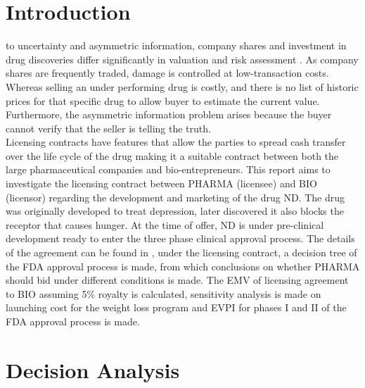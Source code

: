 \documentclass[journal]{IEEEtran}
\begin{document}
\section{Introduction}
 to uncertainty and asymmetric information, company shares and investment in drug discoveries differ significantly in valuation and risk assessment \cite{bioe}. As company shares are frequently traded, damage is controlled at low-transaction costs. Whereas selling an under performing drug is costly, and there is no list of historic prices for that specific drug to allow buyer to estimate the current value. Furthermore, the asymmetric information problem arises because the buyer cannot verify that the seller is telling the truth.\\
Licensing contracts have features that allow the parties to spread cash transfer over the life cycle of the drug making it a suitable contract between both the large pharmaceutical companies and bio-entrepreneurs. This report aims to investigate the licensing contract between PHARMA (licensee) and BIO (licensor) regarding the development and marketing of the drug ND. The drug was originally developed to treat depression, later discovered it also blocks the receptor that causes hunger. At the time of offer, ND is under pre-clinical development ready to enter the three phase clinical approval process. The details of the agreement can be found in \cite{coursework}, under the licensing contract, a decision tree of the FDA approval process is made, from which conclusions on whether PHARMA should bid under different conditions is made. The EMV of licensing agreement to BIO assuming 5\% royalty is calculated, sensitivity analysis is made on launching cost for the weight loss program and EVPI for phases I and II of the FDA approval process is made.
\section{Decision Analysis}	
\end{document}
